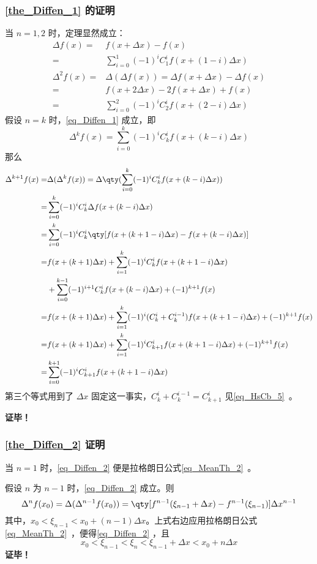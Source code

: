 \subsubsection{\autoref{the_Diffen_1} 的证明}
当 $n=1,2$ 时，定理显然成立：
\begin{equation}
\begin{aligned}
\Delta f(x)=&f(x+\Delta x)-f(x)\\
=&\sum_{i=0}^1(-1)^iC_1^if(x+(1-i)\Delta x)\\
\Delta^2 f(x)=&\Delta (\Delta f(x))=\Delta f(x+\Delta x)-\Delta f(x)\\
=&f(x+2\Delta x)-2f(x+\Delta x)+f(x)\\
=&\sum_{i=0}^2(-1)^iC_2^if(x+(2-i)\Delta x)
\end{aligned}
\end{equation}
假设 $n=k$ 时，\autoref{eq_Diffen_1} 成立，即
\begin{equation}
\Delta^kf(x)=\sum_{i=0}^k(-1)^iC_k^if(x+(k-i)\Delta x)
\end{equation}
那么
\begin{equation}
\begin{aligned}
\Delta^{k+1} f(x)=&\Delta(\Delta^k f(x))=\Delta\qty(\sum_{i=0}^k(-1)^iC_k^if(x+(k-i)\Delta x))\\
=&\sum_{i=0}^k(-1)^iC_k^i\Delta f(x+(k-i)\Delta x)\\
=&\sum_{i=0}^k(-1)^iC_k^i\qty[f(x+(k+1-i)\Delta x)-f(x+(k-i)\Delta x)]\\
=&f(x+(k+1)\Delta x)+\sum_{i=1}^{k}(-1)^iC_k^if(x+(k+1-i)\Delta x)\\
&+\sum_{i=0}^{k-1}(-1)^{i+1}C_k^i f(x+(k-i)\Delta x)+(-1)^{k+1}f(x)\\
=&f(x+(k+1)\Delta x)+\sum_{i=1}^{k}(-1)^{i}(C_k^{i}+C_k^{i-1}) f(x+(k+1-i)\Delta x)+(-1)^{k+1}f(x)\\
=&f(x+(k+1)\Delta x)+\sum_{i=1}^{k}(-1)^{i}C_{k+1}^{i} f(x+(k+1-i)\Delta x)+(-1)^{k+1}f(x)\\
=&\sum_{i=0}^{k+1}(-1)^iC_{k+1}^if(x+(k+1-i)\Delta x)
\end{aligned}
\end{equation}
第三个等式用到了 $\Delta x$ 固定这一事实，$C_k^i+C_k^{i-1}=C_{k+1}^i$ 见\autoref{eq_HsCb_5}~。

\textbf{证毕！}
\subsubsection{\autoref{the_Diffen_2} 证明}
当 $n=1$ 时，\autoref{eq_Diffen_2} 便是拉格朗日公式\autoref{eq_MeanTh_2}~。

假设 $n$ 为 $n-1$ 时，\autoref{eq_Diffen_2} 成立。则
\begin{equation}
\Delta^n f(x_0)=\Delta(\Delta^{n-1}f(x_0))=\qty[f^{n-1}(\xi_{n-1}+\Delta x)-f^{n-1}(\xi_{n-1})]\Delta x^{n-1}
\end{equation}
其中，$x_0<\xi_{n-1}<x_0+(n-1)\Delta x$。上式右边应用拉格朗日公式\autoref{eq_MeanTh_2}~，便得\autoref{eq_Diffen_2} ，且
\begin{equation}
x_0<\xi_{n-1}<\xi_n<\xi_{n-1}+\Delta x<x_0+n\Delta x
\end{equation}
\textbf{证毕！}